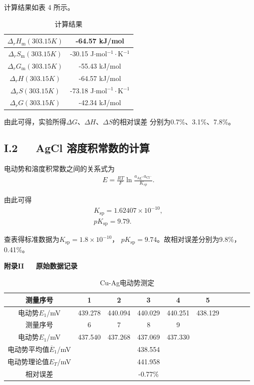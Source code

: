 \documentclass[12pt]{ctexart}
\numberwithin{equation}{section}
\begin{document}
计算结果如表 4 所示。

\begin{longtable}{|c|c|}
    \caption{计算结果} \\
    \hline
    $\Delta_r H_\text{m}(303.15K)$ & -64.57 kJ/mol \\
    \hline
    $\Delta_r S_\text{m}(303.15K)$ & -30.15 J$\cdot$mol$^{-1}\cdot$K$^{-1}$ \\
    \hline
    $\Delta_r G_\text{m}(303.15K)$ & -55.43 kJ/mol \\
    \hline
    $\Delta_r H(303.15K)$ & -64.57 kJ/mol \\
    \hline
    $\Delta_r S(303.15K)$ & -73.18 J$\cdot$mol$^{-1}\cdot$K$^{-1}$ \\
    \hline
    $\Delta_r G(303.15K)$ & -42.34 kJ/mol \\
    \hline
\end{longtable}

由此可得，实验所得$\Delta G$、$\Delta H$、$\Delta S$的相对误差
分别为0.7\%、3.1\%、7.8\%。

\subsection*{I.2~~~AgCl 溶度积常数的计算}

电动势和溶度积常数之间的关系式为
\begin{align}
    E = \frac{RT}{F}\ln
    \frac{a_{\mathrm{Ag^+}}a_{\mathrm{Cl^-}}}{K_{sp}}.
    \tag{I.28}
\end{align}

由此可得
\begin{align}
    K_{\mathrm{sp}} = 1.62407\times 10^{-10},
    \tag{I.29} \\
    pK_{\mathrm{sp}} = 9.79. \tag{I.30}
\end{align}

查表得标准数据为$K_{\mathrm{sp}} = 1.8\times 10^{-10}$，
$pK_{\mathrm{sp}} = 9.74$。故相对误差分别为9.8\%，0.41\%。

\pagebreak

\begin{center}
    \Large\bfseries{附录II~~~原始数据记录}
\end{center}

\begin{longtable}{|c|c|c|c|c|c|c|c|c|c|}
    \caption{Cu-Ag电动势测定} \\
    \hline
    测量序号 & 1 & 2 & 3 & 4 & 5 \\
    \hline
    电动势$E_1$/mV & 439.278& 440.094& 440.029& 440.251& 438.129\\
    \hline
    测量序号 & 6 & 7 & 8 & 9 &  \\
    \hline
    电动势$E_1$/mV & 437.540& 437.268& 437.069& 437.330 & \\
    \hline
    电动势平均值$\overline{E}_1$/mV & \multicolumn{5}{c|}{438.554} \\
    \hline
    电动势理论值$E_T$/mV & \multicolumn{5}{c|}{441.958} \\
    \hline
    相对误差 & \multicolumn{5}{c|}{-0.77\%} \\
    \hline
\end{longtable}
\end{document}
